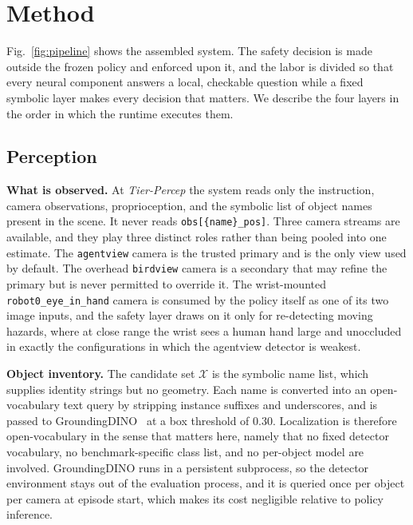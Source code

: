 \section{Method}
\label{sec:method}

Fig.~\ref{fig:pipeline} shows the assembled system. The safety decision is made
outside the frozen policy and enforced upon it, and the labor is divided so that
every neural component answers a local, checkable question while a fixed
symbolic layer makes every decision that matters. We describe the four layers in
the order in which the runtime executes them.

\subsection{Perception}
\label{sec:percep}

\textbf{What is observed.} At \textit{Tier-Percep} the system reads only the
instruction, camera observations, proprioception, and the symbolic list of
object names present in the scene. It never reads
\texttt{obs[\{name\}\_pos]}. Three camera streams are available, and they play
three distinct roles rather than being pooled into one estimate. The
\texttt{agentview} camera is the trusted primary and is the only view used by
default. The overhead \texttt{birdview} camera is a secondary that may refine
the primary but is never permitted to override it. The wrist-mounted
\texttt{robot0\_eye\_in\_hand} camera is consumed by the policy itself as one of
its two image inputs, and the safety layer draws on it only for re-detecting
moving hazards, where at close range the wrist sees a human hand large and
unoccluded in exactly the configurations in which the agentview detector is
weakest.

\textbf{Object inventory.} The candidate set $\mathcal{X}$ is the symbolic name
list, which supplies identity strings but no geometry. Each name is converted
into an open-vocabulary text query by stripping instance suffixes and
underscores, and is passed to GroundingDINO~\cite{gdino} at a box threshold of
0.30. Localization is therefore open-vocabulary in the sense that matters here,
namely that no fixed detector vocabulary, no benchmark-specific class list, and
no per-object model are involved. GroundingDINO runs in a persistent subprocess,
so the detector environment stays out of the evaluation process, and it is
queried once per object per camera at episode start, which makes its cost
negligible relative to policy inference.

